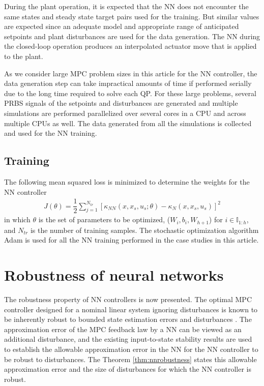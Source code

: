 \documentclass[preprint,5p, twocolumn, authoryear]{elsarticle}
\newcommand{\bbI}{\mathbb{I}}
\begin{document}
During the plant operation, it is expected 
that the NN does not encounter 
the same states and steady state 
target pairs used for the training. But similar
values are expected since an 
adequate model and appropriate 
range of anticipated 
setpoints and plant disturbances are 
used for the data generation. 
The NN during the closed-loop operation
produces an interpolated actuator
move that is applied to the plant. 

As we consider large
MPC problem sizes in this article for the NN 
controller, the data generation step
can take impractical amounts of time if performed
serially due to the long time required to solve 
each QP. For these large problems, 
several PRBS signals of the setpoints 
and disturbances are generated and 
multiple simulations are performed parallelized over 
several cores in a CPU and across multiple CPUs as well.
The data generated from all the simulations is collected
and used for the NN training.

\subsection{Training}
The following mean squared loss is minimized 
to determine the weights for the NN controller
\begin{align}
    J (\theta) = \dfrac{1}{2}\sum_{j=1}^{N_{tr}} 
    [\kappa_{NN}(x, x_s, u_s; \theta) - \kappa_N(x, x_s, u_s)]^2 
\end{align}
in which $\theta$ is the set of parameters 
to be optimized, ($W_i, b_i, W_{h+1}$)
for $i \in \bbI_{1:h}$, and $N_{tr}$ is the number of training 
samples. The stochastic optimization algorithm Adam 
\citep*{kingma:ba:2014} is used for all the NN training
performed in the case studies in this article. 

\section{Robustness of neural networks} \label{sec:robustness}

The robustness property of NN controllers 
is now presented. The optimal MPC controller
designed for a nominal linear system ignoring disturbances
is known to be inherently robust to bounded state 
estimation errors and disturbances
\citep*{heath:wills:2005, pannocchia:rawlings:wright:2011}. 
The approximation
error of the MPC feedback law by a NN can be viewed 
as an additional disturbance, and the existing
input-to-state stability
results \citep*{sontag:wang:1995} are used to establish the 
allowable approximation error in the NN for 
the NN controller to be robust to disturbances. 
The Theorem \ref{thm:nnrobustness} states this 
allowable approximation error and the size 
of disturbances for which the NN controller is robust.
\end{document}
